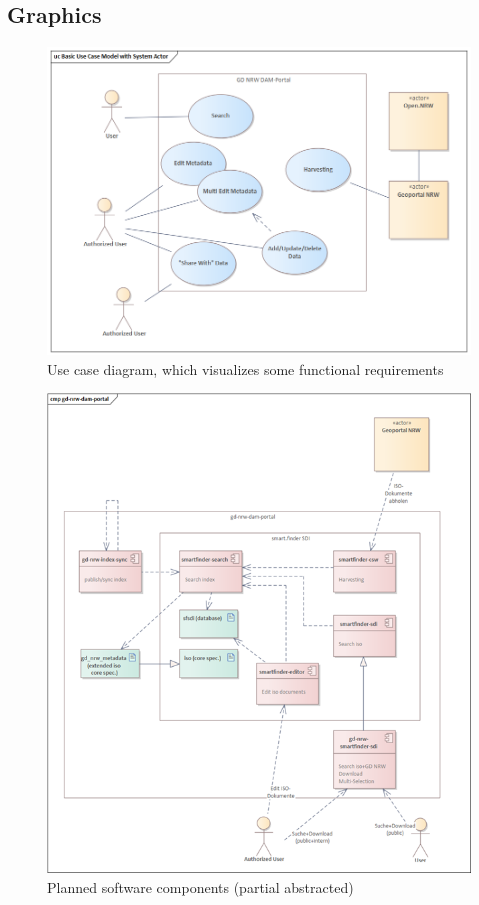 \documentclass[11pt, titlepage, a4paper]{article}
\begin{document}
\begin{appendices}
    \section{Graphics}
    \begin{figure}[H]
        \caption{Use case diagram, which visualizes some functional requirements}
        \label{fig:usecase}
        \includegraphics[width=16cm]{usecase_diagramm.png}
        \centering
    \end{figure}
    \begin{figure}[H]
        \caption{Planned software components (partial abstracted)}
        \label{fig:components}
        \includegraphics[width=16cm]{components_.png}
        \centering
    \end{figure}


\end{appendices}
\end{document}
